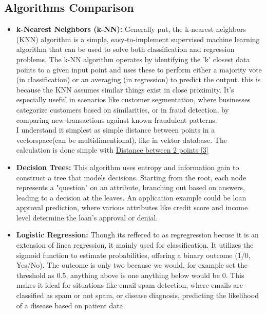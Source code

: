 \documentclass[11pt]{article}
\begin{document}
\subsection{Algorithms Comparison}
\begin{itemize}
    
\item \textbf{k-Nearest Neighbors (k-NN):} Generally put, the k-nearest neighbors (KNN) algorithm is a simple, easy-to-implement supervised machine learning algorithm that can be used to solve both classification and regression problems. The k-NN algorithm operates by identifying the 'k' closest data points to a given input point and uses these to perform either a majority vote (in classification) or an averaging (in regression) to predict the output. this is because the  KNN assumes similar things exist in close proximity. It's especially useful in scenarios like customer segmentation, where businesses categorize customers based on similarities, or in fraud detection, by comparing new transactions against known fraudulent patterns.\\
I understand it simplest as simple distance between points in a \\
vectorspace(can be multidimentional), like in vektor database. The calculation is done simple with \underline{Distance between 2 points [3]}

\item \textbf{Decision Trees:} This algorithm uses entropy and information gain to construct a tree that models decisions. Starting from the root, each node represents a "question" on an attribute, branching out based on answers, leading to a decision at the leaves. An application example could be loan approval prediction, where various attributes like credit score and income level determine the loan's approval or denial.

\item \textbf{Logistic Regression:} Though its reffered to as regregression becuse it is an extension of linea regression, it mainly used for classification. It utilizes the sigmoid function to estimate probabilities, offering a binary outcome (1/0, Yes/No). The outcome is only two because we would, for example set the threshold as 0.5, anything above is one anything below would be 0. This makes it ideal for situations like email spam detection, where emails are classified as spam or not spam, or disease diagnosis, predicting the likelihood of a disease based on patient data.
\end{itemize}
\end{document}
